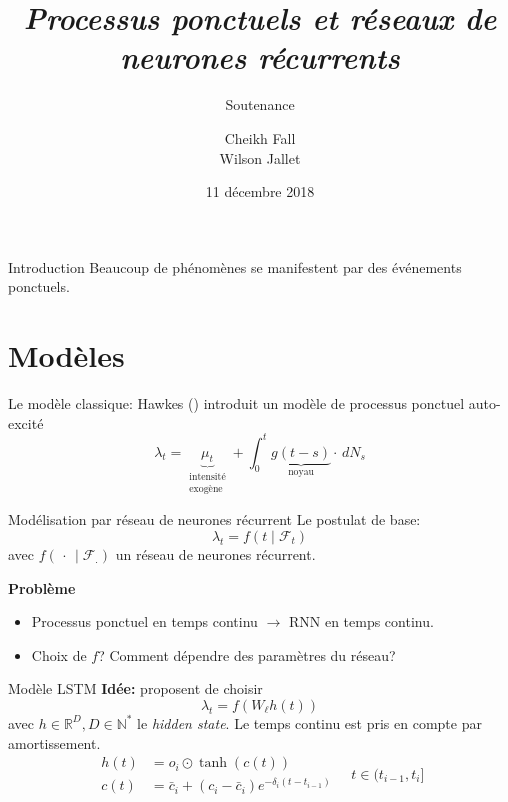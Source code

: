 \documentclass{beamer}
\title{
	\textit{Processus ponctuels et réseaux de neurones récurrents}
}
\subtitle{Soutenance}
\author{
	Cheikh Fall\\
	Wilson Jallet
}
\date{11 décembre 2018}
\newcommand{\RR}{\mathbb{R}}
\newcommand{\NN}{\mathbb{N}}
\begin{document}
\maketitle

\begin{frame}{Introduction}
Beaucoup de phénomènes se manifestent par des événements ponctuels.
\end{frame}

\section{Modèles}

\begin{frame}{Le modèle classique: Hawkes (\citeyear{hawkes1971})}
\citeauthor{hawkes1971} introduit un modèle de processus ponctuel auto-excité
\begin{equation}
\lambda_t =
\underbrace{\mu_t}_{\substack{\text{intensité}\\\text{exogène}}} + \int_0^t \underbrace{g(t-s)}_{\text{noyau}}\cdot\, dN_s
\end{equation}
\end{frame}


\begin{frame}{Modélisation par réseau de neurones récurrent}
Le postulat de base:
\begin{equation}
\lambda_t = f(t\mid \mathcal{F}_t)
\end{equation}
avec $f(\,\cdot\,\mid \mathcal{F_{.}})$ un réseau de neurones récurrent.\pause

\noindent\textbf{Problème} \begin{itemize}
	\item Processus ponctuel en temps continu $\rightarrow$ RNN en temps continu.
	\item Choix de $f$? Comment dépendre des paramètres du réseau?
\end{itemize}

\end{frame}

\begin{frame}{Modèle LSTM \autocite{meiEisnerNeuralHawkes}}
\textbf{Idée:} \citeauthor{meiEisnerNeuralHawkes} proposent de choisir 
\begin{equation}
\lambda_t = f(W_\ell h(t))
\end{equation}
avec $h\in\RR^D, D\in\NN^*$ le \textit{hidden state}. Le temps continu est pris en compte par amortissement.
\begin{equation}\label{eq:meiEisnerHiddenStates}
\begin{aligned}
	h(t) &= o_i \odot \tanh(c(t)) \\
	c(t) &= \bar{c}_i + (c_i - \bar{c}_i)e^{-\delta_i(t - t_{i-1})}
\end{aligned} \quad t\in(t_{i-1}, t_i]
\end{equation}
\end{frame}
\end{document}
